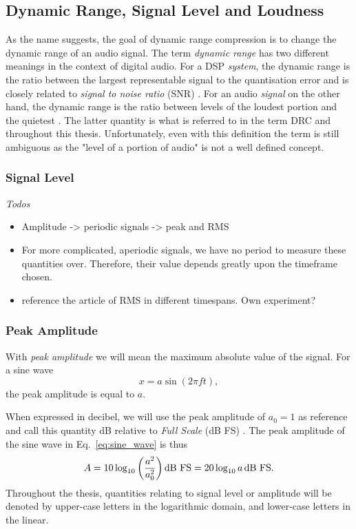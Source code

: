 \documentclass[../main2.tex]{subfiles}
\begin{document}
\subsection{Dynamic Range, Signal Level and Loudness}
As the name suggests, the goal of dynamic range compression is to change the dynamic range of an audio signal. The term \emph{dynamic range} has two different meanings in the context of digital audio. For a DSP \emph{system}, the dynamic range is the ratio between the largest representable signal to the quantisation error and is closely related to \emph{signal to noise ratio} (SNR)  \cite{wilson1993filter}. For an audio \emph{signal} on the other hand, the dynamic range is the ratio between levels of the loudest portion and the quietest \cite{davis1989sound}. The latter quantity is what is referred to in the term DRC and throughout this thesis. Unfortunately, even with this definition the term is still ambiguous as the "level of a portion of audio" is not a well defined concept.

\subsubsection{Signal Level}
\emph{Todos}
\begin{itemize}
\item Amplitude -> periodic signals -> peak and RMS
\item For more complicated, aperiodic signals, we have no period to measure these quantities over. Therefore, their value depends greatly upon the timeframe chosen.
\item reference the article of RMS in different timespans. Own experiment?
\end{itemize}

\subsubsection{Peak Amplitude}
With \emph{peak amplitude} we will mean the maximum absolute value of the signal. For a sine wave
\begin{equation}\label{eq:sine_wave}
x = a \sin(2 \pi f t),
\end{equation}
the peak amplitude is equal to $a$.

When expressed in decibel, we will use the peak amplitude of $a_0=1$ as reference and call this quantity dB relative to \emph{Full Scale} (dB FS) \cite{XXXX}. The peak amplitude of the sine wave in Eq.~\eqref{eq:sine_wave} is thus
\begin{equation}
A = 10 \log_{10} \left( \frac{a^2}{a_0^2} \right) \text{dB FS} = 20 \log_{10} a \mskip3mu\text{dB FS}.
\end{equation}
Throughout the thesis, quantities relating to signal level or amplitude will be denoted by upper-case letters in the logarithmic domain, and lower-case letters in the linear.
\end{document}
